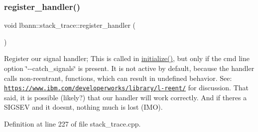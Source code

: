 \subsubsection{\texorpdfstring{register\+\_\+handler()}{register\_handler()}}
{\footnotesize\ttfamily void lbann\+::stack\+\_\+trace\+::register\+\_\+handler (\begin{DoxyParamCaption}{ }\end{DoxyParamCaption})}

Register our signal handler; This is called in \hyperlink{namespacelbann_a3d91b615e42bf5744deeed770879bc8c}{initialize()}, but only if the cmd line option \char`\"{}-\/-\/catch\+\_\+signals\char`\"{} is present. It is not active by default, because the handler calls non-\/reentrant, functions, which can result in undefined behavior. See\+: \href{https://www.ibm.com/developerworks/library/l-reent/}{\tt https\+://www.\+ibm.\+com/developerworks/library/l-\/reent/} for discussion. That said, it is possible (likely?) that our handler will work correctly. And if there\textquotesingle{}s a S\+I\+G\+S\+EV and it doesn\textquotesingle{}t, nothing much is lost (I\+MO). 

Definition at line 227 of file stack\+\_\+trace.\+cpp.



